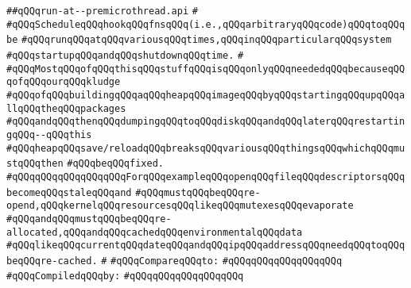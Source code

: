 \label{src/lib/std/src/nj/run-at--premicrothread.api}
\verb|##qQQqrun-at--premicrothread.api|\newline
\verb|#|\newline
\verb|#qQQqScheduleqQQqhookqQQqfnsqQQq(i.e.,qQQqarbitraryqQQqcode)qQQqtoqQQqbe|\newline
\verb|#qQQqrunqQQqatqQQqvariousqQQqtimes,qQQqinqQQqparticularqQQqsystem|\newline
\verb|#qQQqstartupqQQqandqQQqshutdownqQQqtime.|\newline
\verb|#|\newline
\verb|#qQQqMostqQQqofqQQqthisqQQqstuffqQQqisqQQqonlyqQQqneededqQQqbecauseqQQqofqQQqourqQQqkludge|\newline
\verb|#qQQqofqQQqbuildingqQQqaqQQqheapqQQqimageqQQqbyqQQqstartingqQQqupqQQqallqQQqtheqQQqpackages|\newline
\verb|#qQQqandqQQqthenqQQqdumpingqQQqtoqQQqdiskqQQqandqQQqlaterqQQqrestartingqQQq--qQQqthis|\newline
\verb|#qQQqheapqQQqsave/reloadqQQqbreaksqQQqvariousqQQqthingsqQQqwhichqQQqmustqQQqthen|\newline
\verb|#qQQqbeqQQqfixed.|\newline
\verb|#qQQqqQQqqQQqqQQqqQQqForqQQqexampleqQQqopenqQQqfileqQQqdescriptorsqQQqbecomeqQQqstaleqQQqand|\newline
\verb|#qQQqmustqQQqbeqQQqre-opend,qQQqkernelqQQqresourcesqQQqlikeqQQqmutexesqQQqevaporate|\newline
\verb|#qQQqandqQQqmustqQQqbeqQQqre-allocated,qQQqandqQQqcachedqQQqenvironmentalqQQqdata|\newline
\verb|#qQQqlikeqQQqcurrentqQQqdateqQQqandqQQqipqQQqaddressqQQqneedqQQqtoqQQqbeqQQqre-cached.|\newline
\verb|#|\newline
\verb|#qQQqCompareqQQqto:|\newline
\verb|#qQQqqQQqqQQqqQQqqQQq|\newline
\newline
\verb|#qQQqCompiledqQQqby:|\newline
\verb|#qQQqqQQqqQQqqQQqqQQq|\newline
\newline
\newline
\newline
\newline

